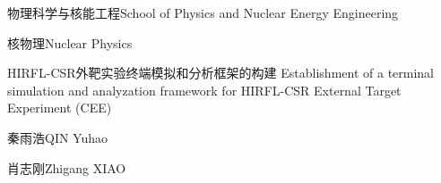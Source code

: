 
\school
{物理科学与核能工程}{School of Physics and Nuclear Energy Engineering}

\major
{核物理}{Nuclear Physics}

\thesistitle
{HIRFL-CSR外靶实验终端模拟和分析框架的构建}
{}
{Establishment of a terminal simulation and analyzation framework for
 HIRFL-CSR External Target Experiment (CEE)}
{}

\thesisauthor
{秦雨浩}{QIN Yuhao}

\teacher
{肖志刚}{Zhigang XIAO}






